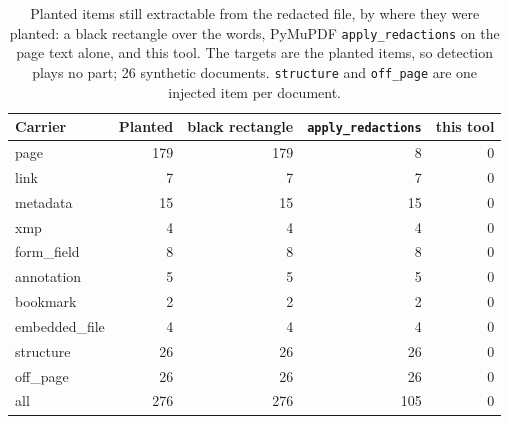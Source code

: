 
\begin{table}[htbp]
\centering
\small
\begin{tabular}{lrrrr}
\toprule
Carrier & Planted & black rectangle & \texttt{apply\_redactions} & this tool \\
\midrule
page & 179 & 179 & 8 & 0 \\
link & 7 & 7 & 7 & 0 \\
metadata & 15 & 15 & 15 & 0 \\
xmp & 4 & 4 & 4 & 0 \\
form\_field & 8 & 8 & 8 & 0 \\
annotation & 5 & 5 & 5 & 0 \\
bookmark & 2 & 2 & 2 & 0 \\
embedded\_file & 4 & 4 & 4 & 0 \\
structure & 26 & 26 & 26 & 0 \\
off\_page & 26 & 26 & 26 & 0 \\
\midrule
all & 276 & 276 & 105 & 0 \\
\bottomrule
\end{tabular}
\caption{Planted items still extractable from the redacted file, by where they were planted: a black rectangle over the words, PyMuPDF \texttt{apply\_redactions} on the page text alone, and this tool. The targets are the planted items, so detection plays no part; 26 synthetic documents. \texttt{structure} and \texttt{off\_page} are one injected item per document.}
\label{tab:leaks}
\end{table}
